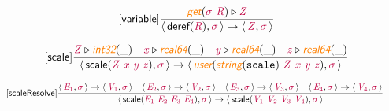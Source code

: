 \documentclass[10pt,leqno,fleqn]{article}
\newcommand{\artVariable}[1]{\mbox{\color{purple}\em #1\/}}
\newcommand{\artConstructor}[1]{\mbox{\sf #1}}
\newcommand{\artCaseInsensitiveLiteral}[1]{\mbox{\tt #1}}
\newcommand{\artSpecial}[1]{\mbox{\color{orange}\sf\em #1}}
\begin{document}
\begin{equation}
\tag*{[\artConstructor{\sf variable}]}
\begin{split}\frac{ \artSpecial{get}(\artVariable{$\sigma$}\ \artVariable{R})\triangleright \artVariable{Z} }{\langle\, \artConstructor{\sf deref}(\artVariable{R}), \artVariable{$\sigma$}\,\rangle \rightarrow \langle\, \artVariable{Z}, \artVariable{$\sigma$}\,\rangle }
\end{split}
\end{equation}

\begin{equation}
\tag*{[\artConstructor{\sf scale}]}
\begin{split}\frac{ \artVariable{Z}\triangleright \artSpecial{int32}(\_) \quad  \artVariable{x}\triangleright \artSpecial{real64}(\_) \quad  \artVariable{y}\triangleright \artSpecial{real64}(\_) \quad  \artVariable{z}\triangleright \artSpecial{real64}(\_) }{\langle\, \artConstructor{\sf scale}(\artVariable{Z}\ \artVariable{x}\ \artVariable{y}\ \artVariable{z}), \artVariable{$\sigma$}\,\rangle \rightarrow \langle\, \artSpecial{user}(\artSpecial{string}(\artCaseInsensitiveLiteral{scale})\ \artVariable{Z}\ \artVariable{x}\ \artVariable{y}\ \artVariable{z}), \artVariable{$\sigma$}\,\rangle }
\end{split}
\end{equation}

\begin{equation}
\tag*{[\artConstructor{\sf scaleResolve}]}
\begin{split}\frac{\langle\, \artVariable{E$_{1}$}, \artVariable{$\sigma$}\,\rangle \rightarrow \langle\, \artVariable{V$_{1}$}, \artVariable{$\sigma$}\,\rangle \quad \langle\, \artVariable{E$_{2}$}, \artVariable{$\sigma$}\,\rangle \rightarrow \langle\, \artVariable{V$_{2}$}, \artVariable{$\sigma$}\,\rangle \quad \langle\, \artVariable{E$_{3}$}, \artVariable{$\sigma$}\,\rangle \rightarrow \langle\, \artVariable{V$_{3}$}, \artVariable{$\sigma$}\,\rangle \quad \langle\, \artVariable{E$_{4}$}, \artVariable{$\sigma$}\,\rangle \rightarrow \langle\, \artVariable{V$_{4}$}, \artVariable{$\sigma$}\,\rangle }{\langle\, \artConstructor{\sf scale}(\artVariable{E$_{1}$}\ \artVariable{E$_{2}$}\ \artVariable{E$_{3}$}\ \artVariable{E$_{4}$}), \artVariable{$\sigma$}\,\rangle \rightarrow \langle\, \artConstructor{\sf scale}(\artVariable{V$_{1}$}\ \artVariable{V$_{2}$}\ \artVariable{V$_{3}$}\ \artVariable{V$_{4}$}), \artVariable{$\sigma$}\,\rangle }
\end{split}
\end{equation}
\end{document}
